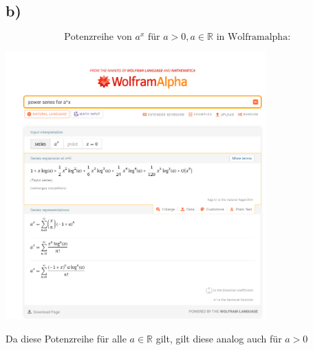     \subsection{b)}
        $$\text{Potenzreihe von }a^x \text{ für } a>0, a\in \mathbb{R} \text{ in Wolframalpha: }$$
            \begin{center}
                \includegraphics[width = 0.75\textwidth]{Aufgaben/01/1b).png}    
            \end{center}

        Da diese Potenzreihe für alle $a \in \mathbb{R}$ gilt, gilt diese analog auch für $a>0$

            